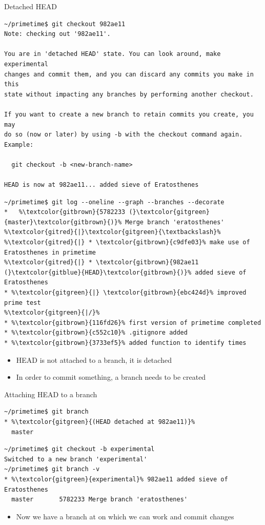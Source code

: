 \documentclass[svgnames]{beamer}
\begin{document}
\begin{frame}[fragile]{Detached HEAD}
 \begin{lstlisting}[basicstyle={\ttfamily\tiny}]
~/primetime$ git checkout 982ae11
Note: checking out '982ae11'.

You are in 'detached HEAD' state. You can look around, make experimental
changes and commit them, and you can discard any commits you make in this
state without impacting any branches by performing another checkout.

If you want to create a new branch to retain commits you create, you may
do so (now or later) by using -b with the checkout command again. Example:

  git checkout -b <new-branch-name>

HEAD is now at 982ae11... added sieve of Eratosthenes
 \end{lstlisting}

 \begin{lstlisting}[escapechar=\%]
~/primetime$ git log --oneline --graph --branches --decorate
*   %\textcolor{gitbrown}{5782233 (}\textcolor{gitgreen}{master}\textcolor{gitbrown}{)}% Merge branch 'eratosthenes'
%\textcolor{gitred}{|}\textcolor{gitgreen}{\textbackslash}%  
%\textcolor{gitred}{|} * \textcolor{gitbrown}{c9dfe03}% make use of Eratosthenes in primetime
%\textcolor{gitred}{|} * \textcolor{gitbrown}{982ae11 (}\textcolor{gitblue}{HEAD}\textcolor{gitbrown}{)}% added sieve of Eratosthenes
* %\textcolor{gitgreen}{|} \textcolor{gitbrown}{ebc424d}% improved prime test
%\textcolor{gitgreen}{|/}%  
* %\textcolor{gitbrown}{116fd26}% first version of primetime completed
* %\textcolor{gitbrown}{c552c10}% .gitignore added
* %\textcolor{gitbrown}{3733ef5}% added function to identify times
 \end{lstlisting}

 \begin{itemize}
  \item HEAD is not attached to a branch, it is detached
  \item In order to commit something, a branch needs to be created
 \end{itemize}
\end{frame}

\begin{frame}[fragile]{Attaching HEAD to a branch}
 \begin{lstlisting}[escapechar=\%]
~/primetime$ git branch
* %\textcolor{gitgreen}{(HEAD detached at 982ae11)}%
  master
 \end{lstlisting}
 \begin{lstlisting}[escapechar=\%]
~/primetime$ git checkout -b experimental
Switched to a new branch 'experimental'
~/primetime$ git branch -v
* %\textcolor{gitgreen}{experimental}% 982ae11 added sieve of Eratosthenes
  master       5782233 Merge branch 'eratosthenes'
 \end{lstlisting}
 \begin{itemize}
  \item Now we have a branch at  on which we can work and commit
        changes
 \end{itemize}
\end{frame}
\end{document}
